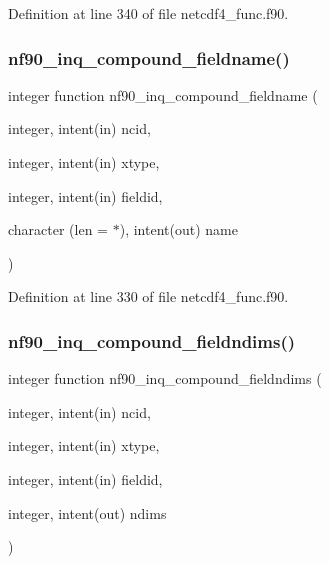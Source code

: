 Definition at line 340 of file netcdf4\+\_\+func.\+f90.

\mbox{\label{netcdf4__func_8f90_af0b1a28ac01add213011608609de2e29}} 
\subsubsection{\texorpdfstring{nf90\+\_\+inq\+\_\+compound\+\_\+fieldname()}{nf90\_inq\_compound\_fieldname()}}
{\footnotesize\ttfamily integer function nf90\+\_\+inq\+\_\+compound\+\_\+fieldname (\begin{DoxyParamCaption}\item[{integer, intent(in)}]{ncid,  }\item[{integer, intent(in)}]{xtype,  }\item[{integer, intent(in)}]{fieldid,  }\item[{character (len = $\ast$), intent(out)}]{name }\end{DoxyParamCaption})}



Definition at line 330 of file netcdf4\+\_\+func.\+f90.

\mbox{\label{netcdf4__func_8f90_a51c0ea15f1ac7f606423cc2c2f03be46}} 
\subsubsection{\texorpdfstring{nf90\+\_\+inq\+\_\+compound\+\_\+fieldndims()}{nf90\_inq\_compound\_fieldndims()}}
{\footnotesize\ttfamily integer function nf90\+\_\+inq\+\_\+compound\+\_\+fieldndims (\begin{DoxyParamCaption}\item[{integer, intent(in)}]{ncid,  }\item[{integer, intent(in)}]{xtype,  }\item[{integer, intent(in)}]{fieldid,  }\item[{integer, intent(out)}]{ndims }\end{DoxyParamCaption})}



